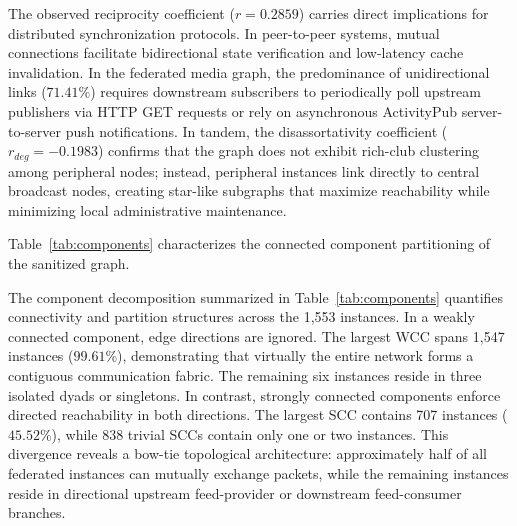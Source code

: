 \documentclass[conference]{IEEEtran}
\begin{document}
The observed reciprocity coefficient ($r = 0.2859$) carries direct implications for distributed synchronization protocols. In peer-to-peer systems, mutual connections facilitate bidirectional state verification and low-latency cache invalidation. In the federated media graph, the predominance of unidirectional links ($71.41\%$) requires downstream subscribers to periodically poll upstream publishers via HTTP GET requests or rely on asynchronous ActivityPub server-to-server push notifications. In tandem, the disassortativity coefficient ($r_{deg} = -0.1983$) confirms that the graph does not exhibit rich-club clustering among peripheral nodes; instead, peripheral instances link directly to central broadcast nodes, creating star-like subgraphs that maximize reachability while minimizing local administrative maintenance.


Table~\ref{tab:components} characterizes the connected component partitioning of the sanitized graph.

\begin{table}[htbp]
\caption{Connected Component Decomposition of the Federated Media Network}
\label{tab:components}
\centering
{}
\end{table}

The component decomposition summarized in Table~\ref{tab:components} quantifies connectivity and partition structures across the 1,553 instances. In a weakly connected component, edge directions are ignored. The largest WCC spans 1,547 instances ($99.61\%$), demonstrating that virtually the entire network forms a contiguous communication fabric. The remaining six instances reside in three isolated dyads or singletons. In contrast, strongly connected components enforce directed reachability in both directions. The largest SCC contains 707 instances ($45.52\%$), while 838 trivial SCCs contain only one or two instances. This divergence reveals a bow-tie topological architecture: approximately half of all federated instances can mutually exchange packets, while the remaining instances reside in directional upstream feed-provider or downstream feed-consumer branches.
\end{document}
